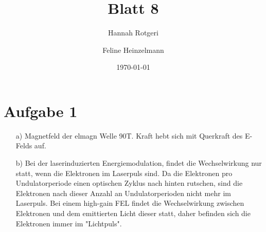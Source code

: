 \documentclass[11pt,a4paper]{article}
\title{Blatt 8}
\date{\today}
\author{Hannah Rotgeri \and Feline Heinzelmann}
\begin{document}
    \maketitle

    \section*{Aufgabe 1}
	\begin{itemize}
		\item[a)] 
			Magnetfeld der elmagn Welle 90T. 
			Kraft hebt sich mit Querkraft des E-Felds auf.
			
		\item[b)]
			Bei der laserinduzierten Energiemodulation, findet die Wechselwirkung nur statt,
			wenn die Elektronen im Laserpuls sind. 
			Da die Elektronen pro Undulatorperiode einen optischen Zyklus nach hinten rutschen,
			sind die Elektronen nach dieser Anzahl an Undulatorperioden nicht mehr im Laserpuls.
			Bei einem high-gain FEL findet die Wechselwirkung zwischen Elektronen und dem emittierten Licht dieser statt,
			daher befinden sich die Elektronen immer im "Lichtpuls".

	\end{itemize}


	
\end{document}

